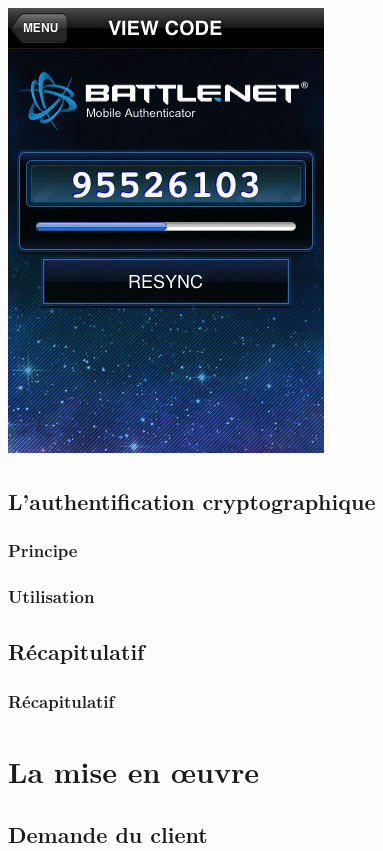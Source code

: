 \documentclass[xcolor=table]{beamer}
\begin{document}
\begin{frame}
\begin{center}
\includegraphics[scale=0.405]{../graphics/blizzardauth.jpg}
\end{center}


\end{frame}

\subsection{L'authentification cryptographique}
\begin{frame}
\frametitle{Principe}
\end{frame}

\begin{frame}
\frametitle{Utilisation}
\end{frame}

\subsection{Récapitulatif}
\begin{frame}
\frametitle{Récapitulatif}
\end{frame}


\section{La mise en œuvre}

\subsection{Demande du client}
\end{document}
